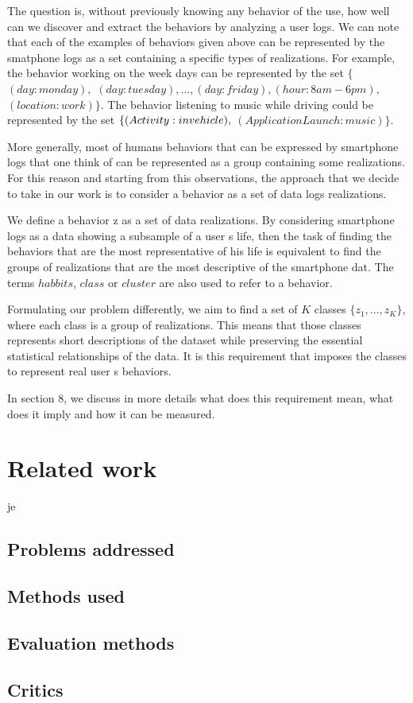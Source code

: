 The question is, without previously knowing any behavior of the use, how well can we discover and extract the behaviors by analyzing a user logs.
We can note that each of the examples of behaviors given above can be represented by the smatphone logs as a set containing a specific types of realizations. For example, the behavior working on the week days can be represented by the set $\{$ $(day: monday),$ $(day: tuesday),$$...,$$(day: friday),$$(hour: 8am-6pm),$ $(location: work) \}$.  The behavior listening to music while driving could be represented by the set $\{ (Activity: in\- vehicle),$ $(Application Launch: music)\}$.

More generally, most of humans behaviors that can be expressed by smartphone logs that one think of can be represented as a group containing some realizations. For this reason and starting from this observations, the approach that we decide to take in our work is to consider a behavior as a set of data logs realizations.

We define a behavior z as a set of data realizations.  By considering smartphone logs as a data showing a subsample of a user s life, then the task of finding the behaviors that are the most representative of his life is equivalent to find the groups of realizations that are the most descriptive of the smartphone dat. The terms $habbits$, $class$ or $cluster$ are also used to refer to a behavior.

Formulating our problem differently, we aim to find a set of $K$ classes $\{ z_1,...,z_K \} $, where each class is a group of realizations. This means that those classes represents short descriptions of the dataset while preserving the essential statistical relationships of the data. It is this requirement that imposes the classes to represent real user s behaviors.

In section 8, we discuss in more details what does this requirement mean, what does it imply and how it can be measured.



\section{Related work}
je \cite{1}
\subsection{Problems addressed}

\subsection{Methods used}

\subsection{Evaluation methods}

\subsection{Critics}


